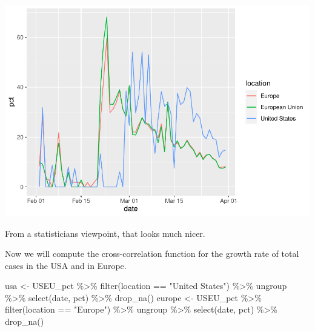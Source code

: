 \documentclass[
]{article}
\newenvironment{Shaded}{}{}
\newcommand{\FunctionTok}[1]{#1}
\newcommand{\NormalTok}[1]{#1}
\newcommand{\OtherTok}[1]{\textcolor[rgb]{1.00,0.25,0.00}{#1}}
\newcommand{\SpecialCharTok}[1]{\textcolor[rgb]{0.00,0.50,0.50}{#1}}
\newcommand{\StringTok}[1]{\textcolor[rgb]{0.00,0.50,0.50}{#1}}
\begin{document}
\includegraphics{covid_files/figure-latex/unnamed-chunk-6-1.pdf}

From a statisticians viewpoint, that looks much nicer.

Now we will compute the cross-correlation function for the growth rate
of total cases in the USA and in Europe.

\begin{Shaded}
\begin{Highlighting}[]
\NormalTok{usa }\OtherTok{\textless{}{-}}\NormalTok{ USEU\_pct }\SpecialCharTok{\%\textgreater{}\%} 
  \FunctionTok{filter}\NormalTok{(location }\SpecialCharTok{==} \StringTok{"United States"}\NormalTok{) }\SpecialCharTok{\%\textgreater{}\%} 
\NormalTok{  ungroup }\SpecialCharTok{\%\textgreater{}\%} 
  \FunctionTok{select}\NormalTok{(date, pct) }\SpecialCharTok{\%\textgreater{}\%} 
  \FunctionTok{drop\_na}\NormalTok{()}
\NormalTok{europe }\OtherTok{\textless{}{-}}\NormalTok{ USEU\_pct }\SpecialCharTok{\%\textgreater{}\%} 
  \FunctionTok{filter}\NormalTok{(location }\SpecialCharTok{==} \StringTok{"Europe"}\NormalTok{) }\SpecialCharTok{\%\textgreater{}\%} 
\NormalTok{  ungroup }\SpecialCharTok{\%\textgreater{}\%} 
  \FunctionTok{select}\NormalTok{(date, pct) }\SpecialCharTok{\%\textgreater{}\%} 
  \FunctionTok{drop\_na}\NormalTok{()}
\end{Highlighting}
\end{Shaded}
\end{document}
